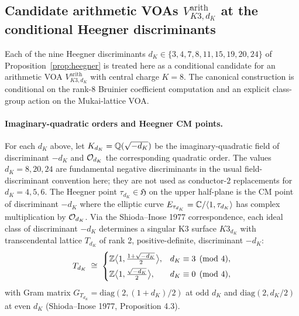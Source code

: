 \subsection{Candidate arithmetic VOAs $V^{\mathrm{arith}}_{K3, d_K}$ at the conditional Heegner discriminants}
\label{subsec:voa-heegner-arithmetic}

Each of the nine Heegner discriminants
$d_K \in \{3, 4, 7, 8, 11, 15, 19, 20, 24\}$ of
Proposition~\ref{prop:heegner} is treated here as a conditional
candidate for an arithmetic VOA
$V^{\mathrm{arith}}_{K3, d_K}$ with central charge $K = 8$. The
canonical construction is conditional on the rank-$8$ Bruinier
coefficient computation and an explicit class-group action on the
Mukai-lattice VOA.

\paragraph{Imaginary-quadratic orders and Heegner CM points.}
For each $d_K$ above, let $K_{d_K} = \mathbb{Q}(\sqrt{-d_K})$ be the
imaginary-quadratic field of discriminant $-d_K$ and
$\mathcal{O}_{d_K}$ the corresponding quadratic order. The values
$d_K=8,20,24$ are fundamental negative discriminants in the usual
field-discriminant convention here; they are not used as
conductor-$2$ replacements for $d_K=4,5,6$. The Heegner point
$\tau_{d_K} \in
\mathfrak H$ on the upper half-plane is the CM point of discriminant
$-d_K$ where the elliptic curve $E_{\tau_{d_K}} = \mathbb{C}/\langle 1,
\tau_{d_K}\rangle$ has complex multiplication by $\mathcal{O}_{d_K}$. Via
the Shioda--Inose 1977 correspondence, each ideal class of
discriminant $-d_K$ determines a singular K3 surface $K3_{d_K}$ with
transcendental lattice
$T_{d_K}$ of rank 2, positive-definite, discriminant $-d_K$:
\begin{equation}
\label{eq:voa-T-dK}
  T_{d_K} \;\cong\; \begin{cases}
    \mathbb{Z}\bigl\langle 1, \tfrac{1 + \sqrt{-d_K}}{2}\bigr\rangle, & d_K \equiv 3 \pmod 4, \\[4pt]
    \mathbb{Z}\bigl\langle 1, \tfrac{\sqrt{-d_K}}{2}\bigr\rangle, & d_K \equiv 0 \pmod 4,
  \end{cases}
\end{equation}
with Gram matrix
$G_{T_{d_K}} = \mathrm{diag}(2, (1 + d_K)/2)$ at odd $d_K$
and $\mathrm{diag}(2, d_K/2)$ at even $d_K$
(Shioda--Inose 1977, Proposition 4.3).

